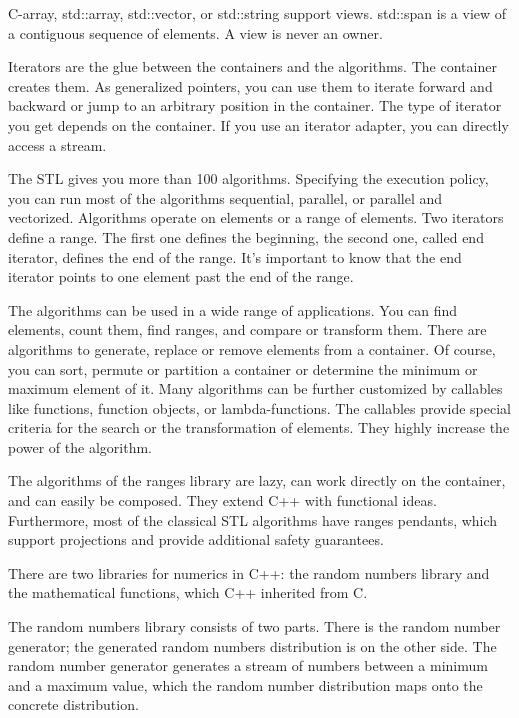 C-array, std::array, std::vector, or std::string support views. std::span is a view of a contiguous sequence of elements. A view is never an owner.

Iterators are the glue between the containers and the algorithms. The container creates them. As generalized pointers, you can use them to iterate forward and backward or jump to an arbitrary position in the container. The type of iterator you get depends on the container. If you use an iterator adapter, you can directly access a stream.

The STL gives you more than 100 algorithms. Specifying the execution policy, you can run most of the algorithms sequential, parallel, or parallel and vectorized. Algorithms operate on elements or a range of elements. Two iterators define a range. The first one defines the beginning, the second one, called end iterator, defines the end of the range. It’s important to know that the end iterator points to one element past the end of the range.

The algorithms can be used in a wide range of applications. You can find elements, count them, find ranges, and compare or transform them. There are algorithms to generate, replace or remove elements from a container. Of course, you can sort, permute or partition a container or determine the minimum or maximum element of it. Many algorithms can be further customized by callables like functions, function objects, or lambda-functions. The callables provide special criteria for the search or the transformation of elements. They highly increase the power of the algorithm.

The algorithms of the ranges library are lazy, can work directly on the container, and can easily be composed. They extend C++ with functional ideas. Furthermore, most of the classical STL algorithms have ranges pendants, which support projections and provide additional safety guarantees.


There are two libraries for numerics in C++: the random numbers library and the mathematical functions, which C++ inherited from C.

The random numbers library consists of two parts. There is the random number generator; the generated random numbers distribution is on the other side. The random number generator generates a stream of numbers between a minimum and a maximum value, which the random number distribution maps onto the concrete distribution.

